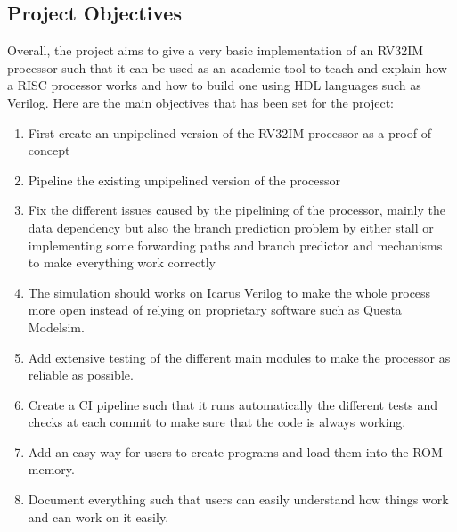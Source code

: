 \subsection{Project Objectives}

Overall, the project aims to give a very basic implementation of an RV32IM processor such 
that it can be used as an academic tool to teach and explain how a RISC processor works 
and how to build one using HDL languages such as Verilog. Here are the main objectives that 
has been set for the project:

\begin{enumerate}[label={\textbullet}]
    \item First create an unpipelined version of the RV32IM processor as a proof of concept
    \item Pipeline the existing unpipelined version of the processor
    \item Fix the different issues caused by the pipelining of the processor, mainly the 
    data dependency but also the branch prediction problem by either stall or implementing some 
    forwarding paths and branch predictor and mechanisms to make everything work correctly
    \item The simulation should works on Icarus Verilog to make the whole process more open instead 
    of relying on proprietary software such as Questa Modelsim.
    \item Add extensive testing of the different main modules to make the processor as reliable 
    as possible.
    \item Create a CI pipeline such that it runs automatically the different tests and checks
    at each commit to make sure that the code is always working.
    \item Add an easy way for users to create programs and load them into the ROM memory.
    \item Document everything such that users can easily understand how things work and can 
    work on it easily.
\end{enumerate}